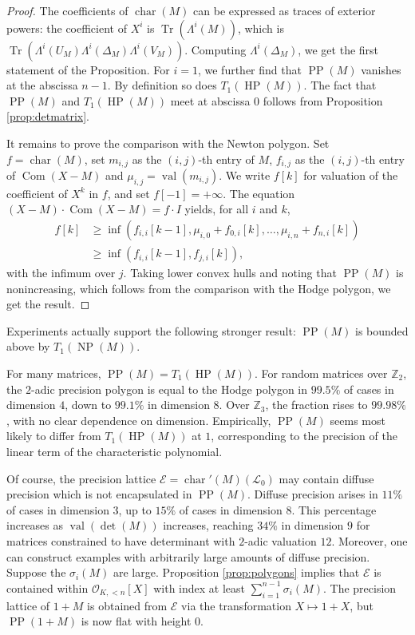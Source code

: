 \documentclass{sig-alternate-2013}
\DeclareMathOperator{\NP}{NP}
\DeclareMathOperator{\HP}{HP}
\DeclareMathOperator{\PP}{PP}
\DeclareMathOperator{\val}{val}
\DeclareMathOperator{\tr}{Tr}
\DeclareMathOperator{\com}{Com}
\newcommand{\Z}{\mathbb Z}
\renewcommand{\O}{\mathcal O}
\DeclareMathOperator{\charpoly}{char}
\newcommand{\charp}{\charpoly'}
\begin{document}
\begin{proof}
The coefficients of $\charpoly(M)$ can be expressed as traces of 
exterior powers: the coefficient of $X^i$ is $\tr(\Lambda^i(M))$,
which is $\tr(\Lambda^i(U_M) \Lambda^i(\Delta_M) \Lambda^i(V_M))$.  
Computing $\Lambda^i(\Delta_M)$, we get the first statement of
the Proposition. For $i = 1$, we further find that $\PP(M)$ vanishes
at the abscissa $n{-}1$. By definition so does $T_1(\HP(M))$. The fact 
that $\PP(M)$ and $T_1(\HP(M))$ meet at abscissa $0$ follows from
Proposition \ref{prop:detmatrix}.

It remains to prove the comparison with the Newton polygon.
Set $f = \charpoly(M)$, set $m_{i,j}$ as the $(i,j)$-th entry of $M$, 
$f_{i,j}$ as the $(i,j)$-th entry of $\com(X{-}M)$ and $\mu_{i,j} = 
\val(m_{i,j})$. We write $f[k]$ 
for valuation of the coefficient of $X^k$ in $f$, and set $f[-1] = 
+\infty$. The equation $(X{-}M) \cdot \com(X{-}M) = f \cdot I$ yields, 
for all $i$ and $k$,
\begin{align*}
f[k] &\ge \inf(f_{i,i}[k{-}1], \mu_{i,0} + f_{0,i}[k], \ldots, 
\mu_{i,n} + f_{n,i}[k]) \\
&\ge \inf(f_{i,i}[k{-}1], f_{j,i}[k]),
\end{align*}
with the infimum over $j$. 
Taking lower convex hulls and noting that $\PP(M)$ is nonincreasing,
which follows from the comparison with the Hodge polygon, we get the 
result.
\end{proof}

\begin{rem}
Experiments actually support the following stronger result: $\PP(M)$ is 
bounded above by $T_1(\NP(M))$.
\end{rem}

For many matrices, $\PP(M) = T_1(\HP(M))$.  For random matrices over 
$\Z_2$, the $2$-adic precision polygon is equal to the Hodge polygon in 
$99.5\%$ of cases in dimension $4$, down to $99.1\%$ in dimension $8$.  
Over $\Z_3$, the fraction rises to $99.98\%$, with no clear dependence on 
dimension.
Empirically, $\PP(M)$ seems most likely to differ from $T_1(\HP(M))$ at 
$1$, corresponding to the precision of the linear term of the 
characteristic polynomial.

Of course, the precision lattice $\mathcal{E} = \charp(M)(\mathcal L_0)$ 
may contain diffuse precision which is not encapsulated in $\PP(M)$.
Diffuse precision arises in $11\%$ of cases in 
dimension $3$, up to $15\%$ of cases in dimension $8$.  This 
percentage increases as $\val(\det(M))$ increases, reaching $34\%$ in 
dimension $9$ for matrices constrained to have determinant with $2$-adic 
valuation $12$.
Moreover, one can construct examples with arbitrarily large amounts of diffuse precision.
Suppose the $\sigma_i(M)$ are large.  
Proposition \ref{prop:polygons} implies that $\mathcal{E}$ is 
contained within $\O_{K, <n}[X]$ with index at least $\sum_{i=1}^{n-1} 
\sigma_i(M)$.  The precision lattice of $1 + M$ is obtained from 
$\mathcal{E}$ via the transformation $X \mapsto 1 + X$, but $\PP(1 + M)$ 
is now flat with height $0$.
\end{document}
